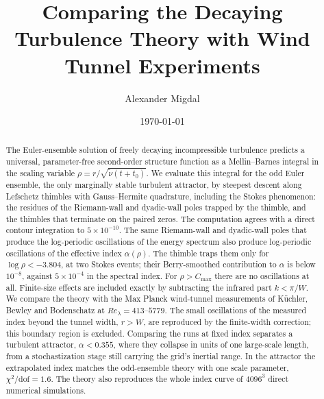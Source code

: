 \documentclass[floatfix,aps,pre,preprint,superscriptaddress,nofootinbib,amsmath,amssymb]{revtex4-2}
\begin{document}
\title{Comparing the Decaying Turbulence Theory with Wind Tunnel Experiments}

\author{Alexander Migdal}

\date{\today}

\begin{abstract}
The Euler-ensemble solution of freely decaying incompressible turbulence predicts a universal, parameter-free second-order
structure function as a Mellin--Barnes integral in the scaling variable $\rho=r/\sqrt{\tilde\nu(t+t_0)}$. We evaluate this
integral for the odd Euler ensemble, the only marginally stable turbulent attractor, by steepest descent along Lefschetz
thimbles with Gauss--Hermite quadrature, including the Stokes phenomenon: the residues of the Riemann-wall and dyadic-wall
poles trapped by the thimble, and the thimbles that terminate on the paired zeros. The computation agrees with a direct
contour integration to $5\times10^{-10}$. The same Riemann-wall and dyadic-wall poles that produce the log-periodic
oscillations of the energy spectrum also produce log-periodic oscillations of the effective index $\alpha(\rho)$. The
thimble traps them only for $\log\rho<-3.804$, at two Stokes events; their Berry-smoothed contribution to $\alpha$ is below
$10^{-8}$, against $5\times10^{-4}$ in the spectral index. For $\rho>C_{\max}$ there are no oscillations at all. Finite-size effects are included exactly by subtracting the
infrared part $k<\pi/W$. We compare the theory with the Max Planck wind-tunnel measurements of Küchler,
Bewley and Bodenschatz at $Re_\lambda=413$--$5779$. The small oscillations of the measured index beyond the
tunnel width, $r>W$, are reproduced by the finite-width correction; this boundary region is excluded. Comparing the runs
at fixed index separates a turbulent attractor, $\alpha<0.355$, where they collapse in units of one large-scale length, from
a stochastization stage still carrying the grid's inertial range. In the attractor the extrapolated index matches the
odd-ensemble theory with one scale parameter, $\chi^2/\mathrm{dof}=1.6$. The theory also reproduces the whole index curve
of $4096^3$ direct numerical simulations.
\end{abstract}


\maketitle
\end{document}
